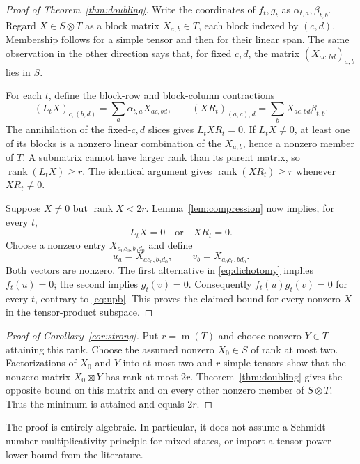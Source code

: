 \documentclass[11pt]{article}
\theoremstyle{definition}
\newcommand{\rank}{\operatorname{rank}}
\newcommand{\minrank}{\operatorname{m}}
\begin{document}
\begin{proof}[Proof of Theorem~\ref{thm:doubling}]
Write the coordinates of $f_t,g_t$ as $\alpha_{t,a},\beta_{t,b}$. Regard
$X\in S\otimes T$ as a block matrix $X_{a,b}\in T$, each block indexed by
$(c,d)$. Membership follows for a simple tensor and then for their linear
span. The same observation in the other direction says that, for fixed
$c,d$, the matrix $(X_{ac,bd})_{a,b}$ lies in $S$.

For each $t$, define the block-row and block-column contractions
\[
 (L_tX)_{c,(b,d)}=\sum_a\alpha_{t,a}X_{ac,bd},\qquad
 (XR_t)_{(a,c),d}=\sum_bX_{ac,bd}\beta_{t,b}.
\]
The annihilation of the fixed-$c,d$ slices gives $L_tXR_t=0$.
If $L_tX\ne0$, at least one of its blocks is a nonzero linear combination
of the $X_{a,b}$, hence a nonzero member of $T$. A submatrix cannot have
larger rank than its parent matrix, so $\rank(L_tX)\ge r$. The identical
argument gives $\rank(XR_t)\ge r$ whenever $XR_t\ne0$.

Suppose $X\ne0$ but $\rank X<2r$. Lemma~\ref{lem:compression} now implies,
for every $t$,
\begin{equation}\label{eq:dichotomy}
 L_tX=0\quad\text{or}\quad XR_t=0.
\end{equation}
Choose a nonzero entry $X_{a_0c_0,b_0d_0}$ and define
\[
 u_a=X_{ac_0,b_0d_0},\qquad v_b=X_{a_0c_0,bd_0}.
\]
Both vectors are nonzero. The first alternative in \eqref{eq:dichotomy}
implies $f_t(u)=0$; the second implies $g_t(v)=0$. Consequently
$f_t(u)g_t(v)=0$ for every $t$, contrary to \eqref{eq:upb}. This proves the
claimed bound for every nonzero $X$ in the tensor-product subspace.
\end{proof}

\begin{proof}[Proof of Corollary~\ref{cor:strong}]
Put $r=\minrank(T)$ and choose nonzero $Y\in T$ attaining this rank. Choose
the assumed nonzero $X_0\in S$ of rank at most two. Factorizations of $X_0$
and $Y$ into at most two and $r$ simple tensors show that the nonzero matrix
$X_0\boxtimes Y$ has rank at most $2r$. Theorem~\ref{thm:doubling} gives the
opposite bound on this matrix and on every other nonzero member of
$S\otimes T$. Thus the minimum is attained and equals $2r$.
\end{proof}

The proof is entirely algebraic. In particular, it does not assume a
Schmidt-number multiplicativity principle for mixed states, or import a
tensor-power lower bound from the literature.
\end{document}

